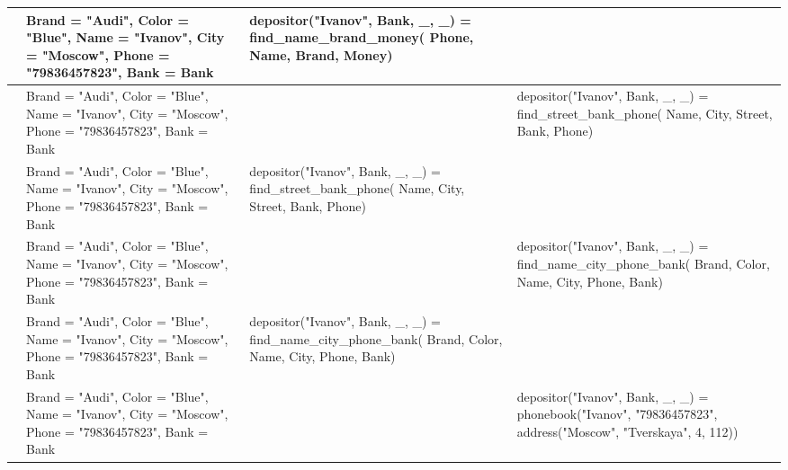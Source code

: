 \documentclass[a4paper,12pt]{article}
\begin{document}
\begin{table}[ht!] 
	\begin{tabularx}{\linewidth}{|>{\centering}p{1.5cm}|>{\centering}p{3.1cm}|>{\centering}X|>{\centering}X|}
		\hline
		48 & Brand = "Audi"{}, Color = "Blue"{}, Name = "Ivanov"{}, City = "Moscow"{}, Phone = "79836457823"{}, Bank = Bank & depositor("Ivanov"{}, Bank, \_, \_) = find\_name\_brand\_money( Phone, Name, Brand, Money) & \tabularnewline
		\hline
		49 & Brand = "Audi"{}, Color = "Blue"{}, Name = "Ivanov"{}, City = "Moscow"{}, Phone = "79836457823"{}, Bank = Bank &  & depositor("Ivanov"{}, Bank, \_, \_) = find\_street\_bank\_phone( Name, City, Street, Bank, Phone) \tabularnewline
		\hline
		50 & Brand = "Audi"{}, Color = "Blue"{}, Name = "Ivanov"{}, City = "Moscow"{}, Phone = "79836457823"{}, Bank = Bank & depositor("Ivanov"{}, Bank, \_, \_) = find\_street\_bank\_phone( Name, City, Street, Bank, Phone) & \tabularnewline
		\hline
		51 & Brand = "Audi"{}, Color = "Blue"{}, Name = "Ivanov"{}, City = "Moscow"{}, Phone = "79836457823"{}, Bank = Bank &  & depositor("Ivanov"{}, Bank, \_, \_) = find\_name\_city\_phone\_bank( Brand, Color, Name, City, Phone, Bank) \tabularnewline
		\hline
		52 & Brand = "Audi"{}, Color = "Blue"{}, Name = "Ivanov"{}, City = "Moscow"{}, Phone = "79836457823"{}, Bank = Bank & depositor("Ivanov"{}, Bank, \_, \_) = find\_name\_city\_phone\_bank( Brand, Color, Name, City, Phone, Bank) & \tabularnewline
		\hline
		53 & Brand = "Audi"{}, Color = "Blue"{}, Name = "Ivanov"{}, City = "Moscow"{}, Phone = "79836457823"{}, Bank = Bank &  & depositor("Ivanov"{}, Bank, \_, \_) = phonebook("Ivanov"{}, "79836457823"{}, address("Moscow"{}, "Tverskaya"{}, 4, 112)) \tabularnewline
		\hline
	\end{tabularx}
\end{table}
\newpage
\end{document}
